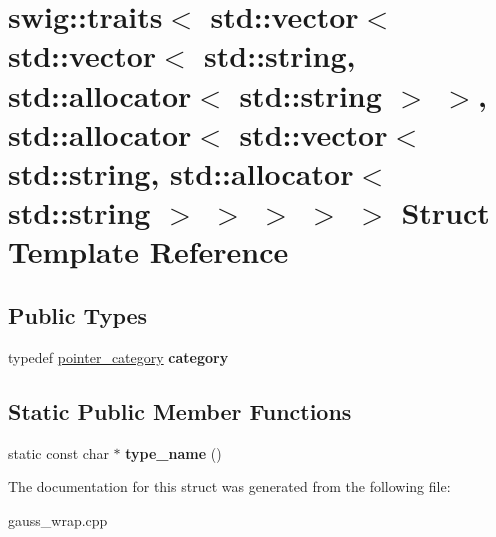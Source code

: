 \hypertarget{structswig_1_1traits_3_01std_1_1vector_3_01std_1_1vector_3_01std_1_1string_00_01std_1_1allocatore0757e712b2d06d425f7dbc58aceaf1d}{\section{swig\-:\-:traits$<$ std\-:\-:vector$<$ std\-:\-:vector$<$ std\-:\-:string, std\-:\-:allocator$<$ std\-:\-:string $>$ $>$, std\-:\-:allocator$<$ std\-:\-:vector$<$ std\-:\-:string, std\-:\-:allocator$<$ std\-:\-:string $>$ $>$ $>$ $>$ $>$ Struct Template Reference}
\label{structswig_1_1traits_3_01std_1_1vector_3_01std_1_1vector_3_01std_1_1string_00_01std_1_1allocatore0757e712b2d06d425f7dbc58aceaf1d}
}
\subsection*{Public Types}
\begin{DoxyCompactItemize}
\item 
\hypertarget{structswig_1_1traits_3_01std_1_1vector_3_01std_1_1vector_3_01std_1_1string_00_01std_1_1allocatore0757e712b2d06d425f7dbc58aceaf1d_a4f7cc6080da93c7265f96ebc27d35459}{typedef \hyperlink{structswig_1_1pointer__category}{pointer\-\_\-category} {\bfseries category}}\label{structswig_1_1traits_3_01std_1_1vector_3_01std_1_1vector_3_01std_1_1string_00_01std_1_1allocatore0757e712b2d06d425f7dbc58aceaf1d_a4f7cc6080da93c7265f96ebc27d35459}

\end{DoxyCompactItemize}
\subsection*{Static Public Member Functions}
\begin{DoxyCompactItemize}
\item 
\hypertarget{structswig_1_1traits_3_01std_1_1vector_3_01std_1_1vector_3_01std_1_1string_00_01std_1_1allocatore0757e712b2d06d425f7dbc58aceaf1d_a3c6378d0aa5715b95d837517ca1591a9}{static const char $\ast$ {\bfseries type\-\_\-name} ()}\label{structswig_1_1traits_3_01std_1_1vector_3_01std_1_1vector_3_01std_1_1string_00_01std_1_1allocatore0757e712b2d06d425f7dbc58aceaf1d_a3c6378d0aa5715b95d837517ca1591a9}

\end{DoxyCompactItemize}


The documentation for this struct was generated from the following file\-:\begin{DoxyCompactItemize}
\item 
gauss\-\_\-wrap.\-cpp\end{DoxyCompactItemize}
